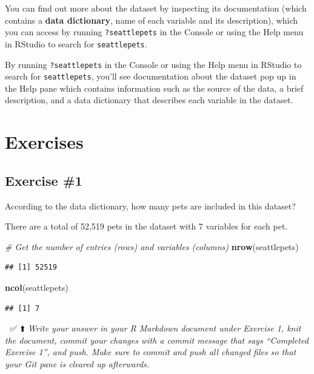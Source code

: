\documentclass[
]{article}
\newenvironment{Shaded}{\begin{snugshade}}{\end{snugshade}}
\newcommand{\CommentTok}[1]{\textcolor[rgb]{0.56,0.35,0.01}{\textit{#1}}}
\newcommand{\FunctionTok}[1]{\textcolor[rgb]{0.13,0.29,0.53}{\textbf{#1}}}
\newcommand{\NormalTok}[1]{#1}
\begin{document}
You can find out more about the dataset by inspecting its documentation
(which contains a \textbf{data dictionary}, name of each variable and
its description), which you can access by running \texttt{?seattlepets}
in the Console or using the Help menu in RStudio to search for
\texttt{seattlepets}.

By running \texttt{?seattlepets} in the Console or using the Help menu
in RStudio to search for \texttt{seattlepets}, you'll see documentation
about the dataset pop up in the Help pane which contains information
such as the source of the data, a brief description, and a data
dictionary that describes each variable in the dataset.

\section{Exercises}\label{exercises}

\subsection{Exercise \#1}\label{exercise-1}

According to the data dictionary, how many pets are included in this
dataset?

There are a total of 52,519 pets in the dataset with 7 variables for
each pet.

\begin{Shaded}
\begin{Highlighting}[]
\CommentTok{\# Get the number of entries (rows) and variables (columns)}
\FunctionTok{nrow}\NormalTok{(seattlepets)}
\end{Highlighting}
\end{Shaded}

\begin{verbatim}
## [1] 52519
\end{verbatim}

\begin{Shaded}
\begin{Highlighting}[]
\FunctionTok{ncol}\NormalTok{(seattlepets)}
\end{Highlighting}
\end{Shaded}

\begin{verbatim}
## [1] 7
\end{verbatim}

🧶 ✅ ⬆️ \emph{Write your answer in your R Markdown document under
Exercise 1, knit the document, commit your changes with a commit message
that says ``Completed Exercise 1'', and push. Make sure to commit and
push all changed files so that your Git pane is cleared up afterwards.}
\end{document}
